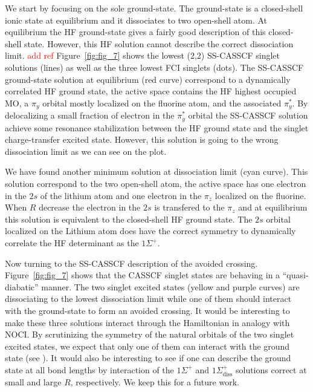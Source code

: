 \documentclass[aps,prb,reprint,showkeys,superscriptaddress]{revtex4-1}
\newcommand{\todo}[1]{\textcolor{red}{#1}}
\begin{document}
We start by focusing on the sole ground-state.
The ground-state is a closed-shell ionic state at equilibrium and it dissociates to two open-shell atom.
At equilibrium the HF ground-state gives a fairly good description of this closed-shell state.
However, this HF solution cannot describe the correct dissociation limit. \todo{add ref}
Figure~\ref{fig:fig_7} shows the lowest (2,2) SS-CASSCF singlet solutions (lines) as well as the three lowest FCI singlets (dots).
The SS-CASSCF ground-state solution at equilibrium (red curve) correspond to a dynamically correlated HF ground state, \ie the active space contains the HF highest occupied MO, a $\pi_y$ orbital mostly localized on the fluorine atom, and the associated $\pi_y^*$.
By delocalizing a small fraction of electron in the $\pi_y^*$ orbital the SS-CASSCF solution achieve some resonance stabilization between the HF ground state and the singlet charge-transfer excited state.
However, this solution is going to the wrong dissociation limit as we can see on the plot.

We have found another minimum solution at dissociation limit (cyan curve).
This solution correspond to the two open-shell atom, the active space has one electron in the $2s$ of the lithium atom and one electron in the $\pi_z$ localized on the fluorine.
When $R$ decrease the electron in the $2s$ is transfered to the $\pi_z$ and at equilibrium this solution is equivalent to the closed-shell HF ground state.
The $2s$ orbital localized on the Lithium atom does have the correct symmetry to dynamically correlate the HF determinant as the $1\Sigma^+$.

Now turning to the SS-CASSCF description of the avoided crossing.
Figure~\ref{fig:fig_7} shows that the CASSCF singlet states are behaving in a ``quasi-diabatic'' manner. The two singlet excited states (yellow and purple curves) are dissociating to the lowest dissociation limit while one of them should interact with the ground-state to form an avoided crossing.
It would be interesting to make these three solutions interact through the Hamiltonian in analogy with NOCI.
By scrutinizing the symmetry of the natural orbitals of the two singlet excited states, we expect that only one of them can interact with the ground state (see \SupInf).
It would also be interesting to see if one can describe the ground state at all bond lengths by interaction of the $1\Sigma^+$ and $1\Sigma^+_{\text{diss}}$ solutions correct at small and large $R$, respectively.
We keep this for a future work.
\end{document}
